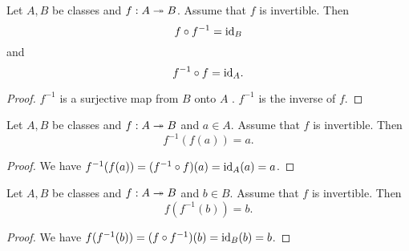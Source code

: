 \documentclass[10pt]{article}
\begin{document}
  \begin{forthel}
    \begin{proposition}
      Let $A, B$ be classes and $f : A \twoheadrightarrow B$.
      Assume that $f$ is invertible.
      Then \[ f \circ f^{-1} = \textrm{id}_{B} \] and \[ f^{-1} \circ f = \textrm{id}_{A}. \]
    \end{proposition}
    \begin{proof}
      $f^{-1}$ is a surjective map from $B$ onto $A$ .
      $f^{-1}$ is the inverse of $f$.
    \end{proof}
  \end{forthel}

  \begin{forthel}
    \begin{proposition}
      Let $A, B$ be classes and $f : A \twoheadrightarrow B$ and $a \in A$.
      Assume that $f$ is invertible.
      Then \[ f^{-1}(f(a)) = a. \]
    \end{proposition}
    \begin{proof}
      We have $f^{-1}(f(a)) = (f^{-1} \circ f)(a) = \textrm{id}_{A}(a) = a$.
    \end{proof}

    \begin{proposition}
      Let $A, B$ be classes and $f : A \twoheadrightarrow B$ and $b \in B$.
      Assume that $f$ is invertible.
      Then \[ f(f^{-1}(b)) = b. \]
    \end{proposition}
    \begin{proof}
      We have
      $f(f^{-1}(b))
        = (f \circ f^{-1})(b)
        = \textrm{id}_{B}(b)
        = b$.
    \end{proof}
  \end{forthel}
\end{document}
